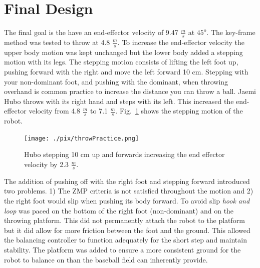 \section{Final Design}\label{sec:finalDesign}

The final goal is the have an end-effector velocity of 9.47 $\frac{m}{s}$ at $45^o$.  
The key-frame method was tested to throw at 4.8 $\frac{m}{s}$.  
To increase the end-effector velocity the upper body motion was kept unchanged but the lower body added a stepping motion with its legs.
The stepping motion consists of lifting the left foot up, pushing forward with the right and move the left forward 10 cm.  
Stepping with your non-dominant foot, and pushing with the dominant, when throwing overhand is common practice to increase the distance you can throw a ball.  
Jaemi Hubo throws with its right hand and steps with its left.  
This increased the end-effector velocity from 4.8 $\frac{m}{s}$ to 7.1 $\frac{m}{s}$.
Fig.~\ref{fig:hubo-step} shows the stepping motion of the robot.

\begin{figure}[t]
  \centering
\texttt{[image: ./pix/throwPractice.png]}
  \caption{Hubo stepping 10 cm up and forwards increasing the end effector velocity by 2.3 $\frac{m}{s}$.}
  \label{fig:hubo-step}
\end{figure}

The addition of pushing off with the right foot and stepping forward introduced two problems.  1) The ZMP criteria is not satisfied throughout the motion and 2) the right foot would slip when pushing its body forward.  
To avoid slip \textit{hook and loop} was paced on the bottom of the right foot (non-dominant) and on the throwing platform.  
This did not permanently attach the robot to the platform but it did allow for more friction between the foot and the ground.
This allowed the balancing controller to function adequately for the short step and maintain stability.
The platform was added to ensure a more consistent ground for the robot to balance on than the baseball field can inherently provide.

